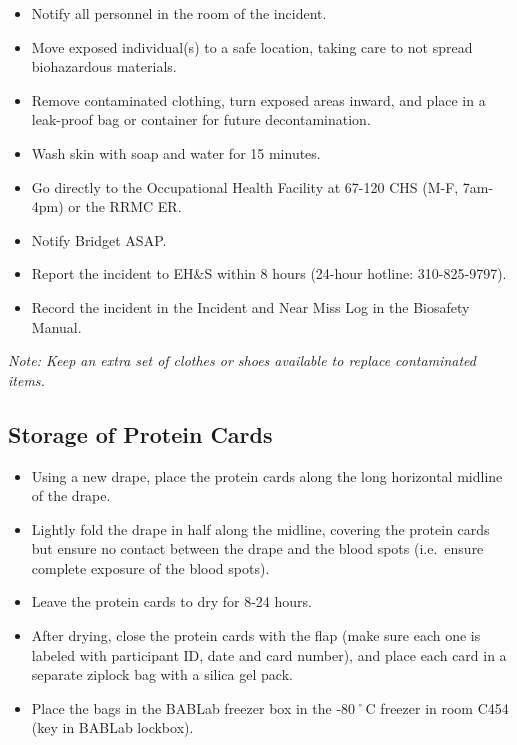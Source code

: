 \documentclass[]{book}
\providecommand{\tightlist}{%
  \setlength{\itemsep}{0pt}\setlength{\parskip}{0pt}}
\begin{document}
\begin{itemize}
\tightlist
\item
  Notify all personnel in the room of the incident.
\item
  Move exposed individual(s) to a safe location, taking care to not spread biohazardous materials.
\item
  Remove contaminated clothing, turn exposed areas inward, and place in a leak-proof bag or container for future decontamination.
\item
  Wash skin with soap and water for 15 minutes.
\item
  Go directly to the Occupational Health Facility at 67-120 CHS (M-F, 7am-4pm) or the RRMC ER.
\item
  Notify Bridget ASAP.
\item
  Report the incident to EH\&S within 8 hours (24-hour hotline: 310-825-9797).
\item
  Record the incident in the Incident and Near Miss Log in the Biosafety Manual.
\end{itemize}

\emph{Note: Keep an extra set of clothes or shoes available to replace contaminated items.}

\hypertarget{storage-of-protein-cards}{%
\subsection{Storage of Protein Cards}\label{storage-of-protein-cards}}

\begin{itemize}
\tightlist
\item
  Using a new drape, place the protein cards along the long horizontal midline of the drape.
\item
  Lightly fold the drape in half along the midline, covering the protein cards but ensure no contact between the drape and the blood spots (i.e.~ensure complete exposure of the blood spots).
\item
  Leave the protein cards to dry for 8-24 hours.
\item
  After drying, close the protein cards with the flap (make sure each one is labeled with participant ID, date and card number), and place each card in a separate ziplock bag with a silica gel pack.
\item
  Place the bags in the BABLab freezer box in the -80˚C freezer in room C454 (key in BABLab lockbox).
\end{itemize}
\end{document}
